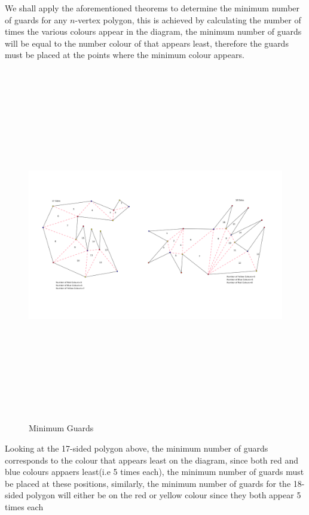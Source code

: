 \documentclass[10pt,a4paper]{article}
\begin{document}
We shall apply the aforementioned theorems to determine the minimum number of guards for any $n$-vertex polygon, this is achieved by calculating the number of times the various colours appear in the diagram, the minimum number of guards will be equal to the number colour of that appears least, therefore the guards must be placed at the points where the minimum colour appears.
\newpage
\begin{figure}[h!]\label{colouration}
\centering
\includegraphics[width=12.0cm,height= 15.5cm]{image2.png}
\caption{Minimum Guards}
\end{figure}

Looking at the 17-sided polygon above, the minimum number of guards corresponds to the colour that appears least on the diagram, since both red and blue colours appaers least(i.e 5 times each), the minimum number of guards must be placed at these positions, similarly, the minimum number of guards for the 18-sided polygon will either be on the red or yellow colour since they both appear 5 times each 
\end{document}
